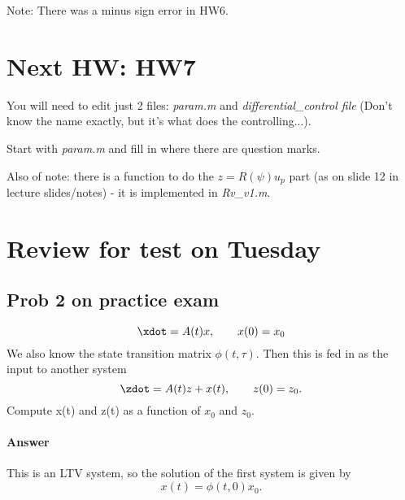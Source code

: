 \documentclass[10pt]{article}
\title{}
\author{}
\date{Sept. 2, 2014}
\begin{document}
\maketitle

Note: There was a minus sign error in HW6.

\section{Next HW: HW7}
You will need to edit just 2 files: \emph{param.m} and
\emph{differential\_control file} (Don't know the name exactly, but
it's what does the controlling...).

Start with \emph{param.m} and fill in where there are question marks.

Also of note: there is a function to do the $z = R(\psi)u_p$ part (as
on slide 12 in lecture slides/notes) - it is implemented in
\emph{Rv\_v1.m}. 

\section{Review for test on Tuesday}

\subsection{Prob 2 on practice exam}
\begin{equation}
  \xdot = A(t)x, \qquad x(0) = x_0
\end{equation}
We also know the state transition matrix $\phi(t,\tau)$.
Then this is fed in as the input to another system
\begin{equation}
  \zdot = A(t)z + x(t), \qquad z(0) = z_0.
\end{equation}
Compute x(t) and z(t) as a function of $x_0$ and $z_0$.

\paragraph{Answer}
This is an LTV system, so the solution of the first system is given by 
\begin{equation}
  x(t) = \phi(t,0)x_0.
\end{equation}
\begin{wrapfigure}[11]{r}{.4\textwidth}
\end{wrapfigure}
\end{document}
